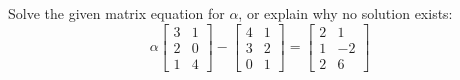 Solve the given matrix equation for $\alpha$, or explain why no solution exists:
%
\begin{equation*}
\alpha \begin{bmatrix} 3 & 1 \\ 2 & 0 \\ 1 & 4\end{bmatrix} -
\begin{bmatrix} 4 & 1 \\ 3 & 2 \\ 0 & 1 \end{bmatrix}
=
\begin{bmatrix} 2 & 1 \\ 1 & -2 \\ 2 & 6 \end{bmatrix}
\end{equation*}
%